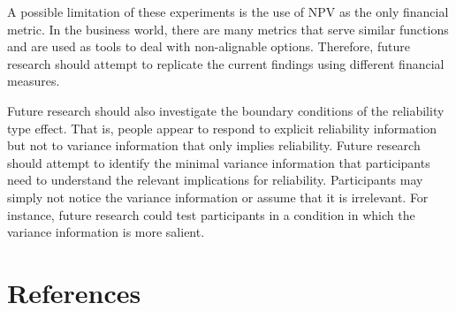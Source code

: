 \documentclass[
  english,
  man, donotrepeattitle,floatsintext]{apa7}
\theoremstyle{definition}
\theoremstyle{definition}
\theoremstyle{definition}
\theoremstyle{definition}
\theoremstyle{remark}
\begin{document}
A possible limitation of these experiments is the use of NPV as the only
financial metric. In the business world, there are many metrics that serve
similar functions and are used as tools to deal with non-alignable options.
Therefore, future research should attempt to replicate the current findings
using different financial measures.

Future research should also investigate the boundary conditions of the
reliability type effect. That is, people appear to respond to explicit
reliability information but not to variance information that only implies
reliability. Future research should attempt to identify the minimal variance
information that participants need to understand the relevant implications for
reliability. Participants may simply not notice the variance information or
assume that it is irrelevant. For instance, future research could test
participants in a condition in which the variance information is more salient.

\newpage

\newpage

\hypertarget{references}{%
\section{References}\label{references}}

\begingroup
\setlength{\parindent}{-0.5in}
\setlength{\leftskip}{0.5in}
\end{document}
